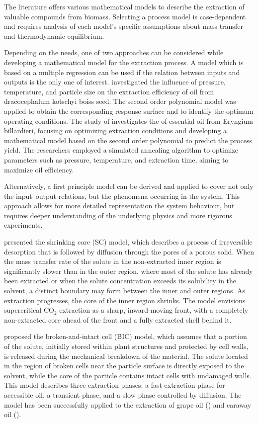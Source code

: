 \documentclass[a4paper,fleqn]{cas-dc}
\begin{document}
	The literature offers various mathematical models to describe the extraction of valuable compounds from biomass. Selecting a process model is case-dependent and requires analysis of each model's specific assumptions about mass transfer and thermodynamic equilibrium.
	
	Depending on the needs, one of two approaches can be considered while developing a mathematical model for the extraction process. A model which is based on a multiple regression can be used if the relation between inputs and outputs is the only one of interest. \citet{Sodeifian2017a} investigated the influence of pressure, temperature, and particle size on the extraction efficiency of oil from dracocephalum kotschyi boiss seed. The second order polynomial model was applied to obtain the corresponding response surface and to identify the optimum operating conditions. 
	The study of \citet{Sodeifian2017b} investigates the of essential oil from Eryngium billardieri, focusing on optimizing extraction conditions and developing a mathematical model based on the second order polynomial to predict the process yield. The researchers employed a simulated annealing algorithm to optimize parameters such as pressure, temperature, and extraction time, aiming to maximize oil efficiency.
	
	Alternatively, a first principle model can be derived and applied to cover not only the input--output relations, but the phenomena occurring in the system. This approach allows for more detailed representation the system behaviour, but requires deeper understanding of the underlying physics and more rigorous experiments.
	
	\citet{Goto1996} presented the shrinking core (SC) model, which describes a process of irreversible desorption that is followed by diffusion through the pores of a porous solid. When the mass transfer rate of the solute in the non-extracted inner region is significantly slower than in the outer region, where most of the solute has already been extracted or when the solute concentration exceeds its solubility in the solvent, a distinct boundary may form between the inner and outer regions. As extraction progresses, the core of the inner region shrinks. The model envisions supercritical CO$_2$ extraction as a sharp, inward-moving front, with a completely non-extracted core ahead of the front and a fully extracted shell behind it.
	
	\citet{Sovova1994} proposed the broken-and-intact cell (BIC) model, which assumes that a portion of the solute, initially stored within plant structures and protected by cell walls, is released during the mechanical breakdown of the material. The solute located in the region of broken cells near the particle surface is directly exposed to the solvent, while the core of the particle contains intact cells with undamaged walls. This model describes three extraction phases: a fast extraction phase for accessible oil, a transient phase, and a slow phase controlled by diffusion. The model has been successfully applied to the extraction of grape oil (\citet{Sovova1994b}) and caraway oil (\citet{Sovova1994a}).
	
\end{document}
